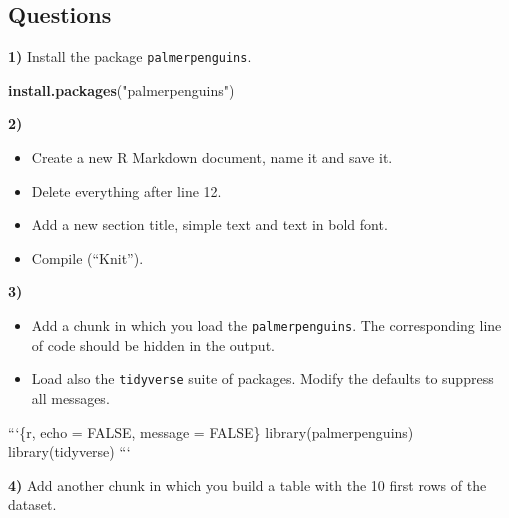 \documentclass[
  12pt,
]{book}
\newenvironment{Shaded}{\begin{snugshade}}{\end{snugshade}}
\newcommand{\BaseNTok}[1]{\textcolor[rgb]{0.00,0.00,0.81}{#1}}
\newcommand{\KeywordTok}[1]{\textcolor[rgb]{0.13,0.29,0.53}{\textbf{#1}}}
\newcommand{\NormalTok}[1]{#1}
\newcommand{\StringTok}[1]{\textcolor[rgb]{0.31,0.60,0.02}{#1}}
\providecommand{\tightlist}{%
  \setlength{\itemsep}{0pt}\setlength{\parskip}{0pt}}
\begin{document}
\hypertarget{questions}{%
\subsection{Questions}\label{questions}}

\textbf{1)} Install the package \texttt{palmerpenguins}.

\begin{Shaded}
\begin{Highlighting}[]
\KeywordTok{install.packages}\NormalTok{(}\StringTok{"palmerpenguins"}\NormalTok{)}
\end{Highlighting}
\end{Shaded}

\textbf{2)}

\begin{itemize}
\tightlist
\item
  Create a new R Markdown document, name it and save it.
\item
  Delete everything after line 12.
\item
  Add a new section title, simple text and text in bold font.
\item
  Compile (``Knit'').
\end{itemize}

\textbf{3)}

\begin{itemize}
\tightlist
\item
  Add a chunk in which you load the \texttt{palmerpenguins}. The corresponding line of code should be hidden in the output.
\item
  Load also the \texttt{tidyverse} suite of packages. Modify the defaults to suppress all messages.
\end{itemize}

\begin{Shaded}
\begin{Highlighting}[]
\BaseNTok{```\{r, echo = FALSE, message = FALSE\}}
\BaseNTok{library(palmerpenguins)}
\BaseNTok{library(tidyverse)}
\BaseNTok{```}
\end{Highlighting}
\end{Shaded}

\textbf{4)} Add another chunk in which you build a table with the 10 first rows of the dataset.

\begin{Shaded}
\end{Shaded}
\end{document}
